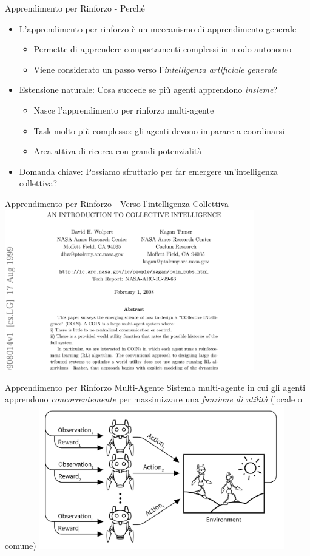 \documentclass[presentation, 10pt,aspectratio=169]{beamer}\mode<presentation>{\usetheme{AMSBolognaFC}}
\begin{document}
\begin{frame}{Apprendimento per Rinforzo - Perché}
	\begin{itemize}
		\item L'apprendimento per rinforzo è un meccanismo di apprendimento \alert{generale}
		\begin{itemize}
			\item Permette di apprendere comportamenti \underline{complessi} in modo autonomo
			\item Viene considerato un passo verso l'\emph{intelligenza artificiale generale}
		\end{itemize}
		\item \alert{Estensione naturale}: Cosa succede se più agenti apprendono \emph{insieme}?
		\begin{itemize}
			\item Nasce l'apprendimento per rinforzo \alert{multi-agente}
			\item Task molto più complesso: gli agenti devono imparare a coordinarsi
			\item Area attiva di ricerca con grandi potenzialità
		\end{itemize}
		\item \alert{Domanda chiave}: Possiamo sfruttarlo per far emergere un'intelligenza collettiva?
	\end{itemize}
\end{frame}
\begin{frame}{Apprendimento per Rinforzo - Verso l'intelligenza Collettiva}
	\centering
	\href{https://arxiv.org/abs/cs/9908014}{\includegraphics[height=7cm]{img/COIN.png}}
\end{frame}
\begin{frame}{Apprendimento per Rinforzo Multi-Agente}
	Sistema multi-agente in cui gli agenti apprendono \emph{concorrentemente} per massimizzare una \emph{funzione di utilità} (locale o comune)
	\centering
	\includegraphics[width=0.8\textwidth]{img/marl.png}
\end{frame}
\end{document}
